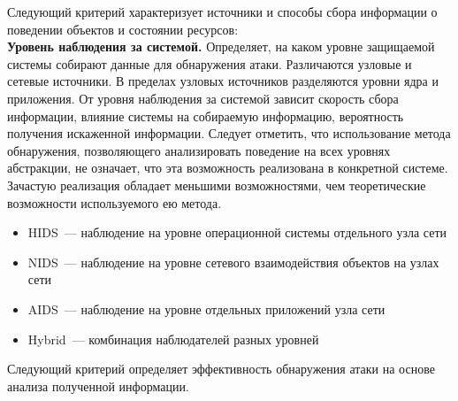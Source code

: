 Следующий критерий характеризует источники и способы сбора информации о поведении объектов и состоянии ресурсов:\\

\textbf{Уровень наблюдения за системой.} Определяет, на каком уровне защищаемой системы собирают данные для обнаружения атаки. Различаются узловые и сетевые источники. В пределах узловых источников разделяются уровни ядра и приложения. От уровня наблюдения за системой зависит скорость сбора информации, влияние системы на собираемую информацию, вероятность получения искаженной информации. Следует отметить, что использование метода обнаружения, позволяющего анализировать поведение на всех уровнях абстракции, не означает, что эта возможность реализована в конкретной системе. Зачастую реализация обладает меньшими возможностями, чем теоретические возможности используемого ею метода. 

\begin{itemize}

\item HIDS~--- наблюдение на уровне операционной системы отдельного узла сети
\item NIDS~--- наблюдение на уровне сетевого взаимодействия объектов на узлах сети
\item AIDS~--- наблюдение на уровне отдельных приложений узла сети
\item Hybrid~--- комбинация наблюдателей разных уровней

\end{itemize}

Следующий критерий определяет эффективность обнаружения атаки на основе анализа полученной информации.

